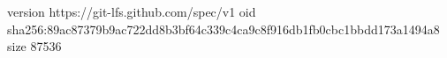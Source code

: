 version https://git-lfs.github.com/spec/v1
oid sha256:89ac87379b9ac722dd8b3bf64c339c4ca9c8f916db1fb0cbc1bbdd173a1494a8
size 87536

